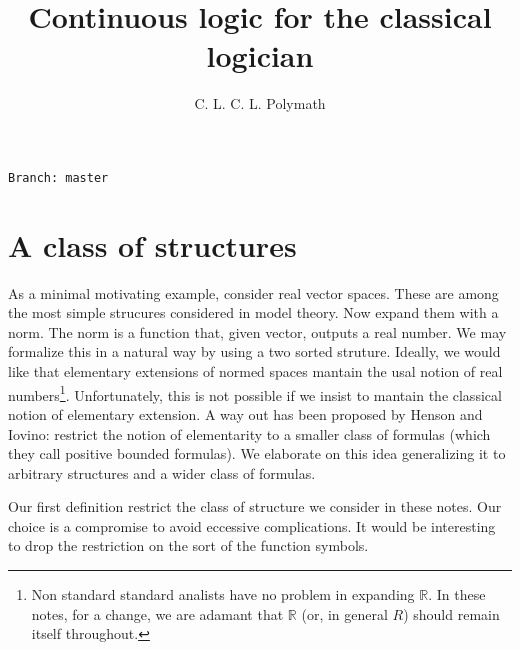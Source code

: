 \documentclass[11pt,oneside]{amsart}
\author{C. L. C. L. Polymath}
\theoremstyle{plain}
\theoremstyle{remark}
\begin{document}
\title{Continuous logic for the classical logician}
\hfill\texttt{Branch:\ master\ \DTMnow}\bigskip
\maketitle
\raggedbottom


\newcommand\dangersign[1][2ex]{%
  \renewcommand\stacktype{L}%
  \scaleto{\stackon[-.6pt]{\color{red}$\triangle$}{\color{red}\bfseries\small ?}}{#1}%
}


\section{A class of structures}\label{uno}


\def\ceq#1#2#3{\parbox[t]{23ex}{$\displaystyle #1$}\parbox{6ex}{\hfil $#2$}{$\displaystyle #3$}}

As a minimal motivating example, consider real vector spaces.
These are among the most simple strucures considered in model theory.
Now expand them with a norm.
The norm is a function that, given vector, outputs a real number.
We may formalize this in a natural way by using a two sorted struture.
Ideally, we would like that elementary extensions of normed spaces mantain the usal notion of real numbers\footnote{Non standard standard analists have no problem in expanding $\mathds{R}$. In these notes, for a change, we are adamant that $\mathds{R}$ (or, in general $R$) should remain itself throughout.}. Unfortunately, this is not possible if we insist to mantain the classical notion of elementary extension.
A way out has been proposed by Henson and Iovino: restrict the notion of elementarity to a smaller class of formulas (which they call positive bounded formulas).
We elaborate on this idea generalizing it to arbitrary structures and a wider class of formulas.

Our first definition restrict the class of structure we consider in these notes.
Our choice is a compromise to avoid eccessive complications.
It would be interesting to drop the restriction on the sort of the function symbols. 
\end{document}
